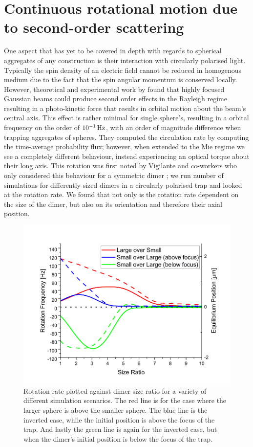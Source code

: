 \section{Continuous rotational motion due to second-order scattering}

One aspect that has yet to be covered in depth with regards to
spherical aggregates of any construction is their interaction with
circularly polarised light.  Typically the spin density of an electric
field cannot be reduced in homogenous medium due to the fact that the
spin angular momentum is conserved locally.  However, theoretical and
experimental work by \cite{Yevick2017} found that highly focused
Gaussian beams could produce second order effects in the Rayleigh
regime resulting in a photo-kinetic force that results in orbital
motion about the beam's central axis. This effect is rather minimal
for single sphere's, resulting in a orbital frequency on the order of
$10^{-1}\,{\rm Hz}$, with an order of magnitude difference when
trapping aggregates of spheres.  They computed the circulation rate by
computing the time-average probability flux; however, when extended to
the Mie regime we see a completely different behaviour, instead
experiencing an optical torque about their long axis.  This rotation
was first noted by Vigilante and co-workers who only considered this
behaviour for a symmetric dimer \cite{Vigilante2020}; we run number of
simulations for differently sized dimers in a circularly polarised
trap and looked at the rotation rate.  We found that not only is the
rotation rate dependent on the size of the dimer, but also on its
orientation and therefore their axial position.

\begin{figure}[h]
  \centering
  \includegraphics[width=0.65\linewidth]{rotation_rate_vs_size.png}
  \caption{Rotation rate plotted against dimer size ratio for a variety of different simulation scenarios. The red line is for the case where the larger sphere is above the smaller sphere. The blue line is the inverted case, while the initial position is above the focus of the trap. And lastly the green line is again for the inverted case, but when the dimer's initial position is below the focus of the trap.}
\end{figure}

